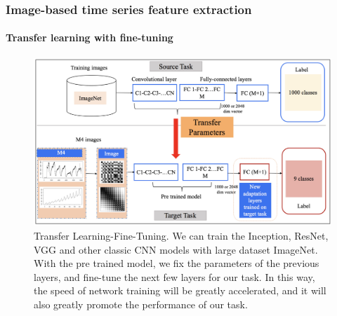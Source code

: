 \documentclass[10pt,aspectratio=43]{beamer}
\begin{document}
\begin{frame}
  \frametitle{Image-based time series feature extraction}
  \framesubtitle{Transfer learning with fine-tuning}

\begin{figure}[thb]
  \centering
  \includegraphics[width=0.8\linewidth]{figures/transfer-learning.jpg}
  \caption{\footnotesize{Transfer Learning-Fine-Tuning. We can train the Inception\citep{Szegedy2016Rethinking}, ResNet\citep{Szegedy2016Inception}, VGG\citep{Simonyan2014Very} and other classic CNN models with large dataset ImageNet\citep{Deng2009ImageNet}. With the pre trained model, we fix the parameters of the previous layers, and fine-tune the next few layers for our task. In this way, the speed of network training will be greatly accelerated, and it will also greatly promote the performance of our task.}}
  \label{fig:transfer-learning}
\end{figure}
\end{frame}
\end{document}
